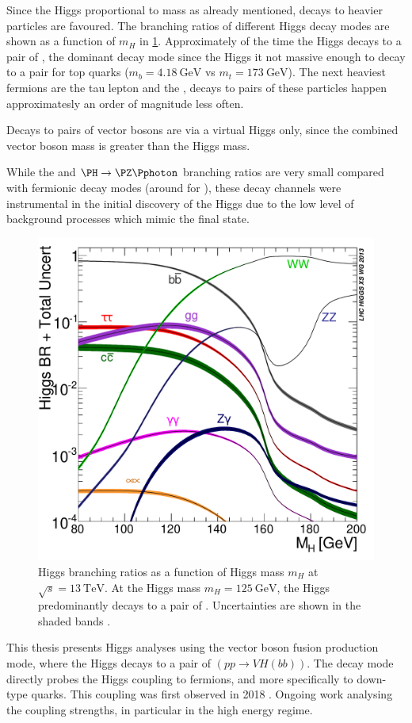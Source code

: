 Since the Higgs proportional to mass as already mentioned, decays to heavier particles are favoured.
The branching ratios of different Higgs decay modes are shown as a function of $m_H$ in \cref{fig:higgs_br}.
Approximately  of the time the Higgs decays to a pair of \bquarks, the dominant decay mode since the Higgs it not massive enough to decay to a pair for top quarks ($m_b = \SI{4.18}{\GeV}$ vs $m_t = \SI{173}{\GeV}$).
The next heaviest fermions are the tau lepton and the \cquark, decays to pairs of these particles happen approximatesly an order of magnitude less often.

Decays to pairs of vector bosons are via a virtual Higgs only, since the combined vector boson mass is greater than the Higgs mass.

While the \Hgammagamma and $\PH \rightarrow \Zboson \Pphoton$ branching ratios are very small compared with fermionic decay modes (around  for \Hgammagamma), these decay channels were instrumental in the initial discovery of the Higgs due to the low level of background processes which mimic the final state.

\begin{figure}[!htbp]
  \centering
  \includegraphics[width=0.5\linewidth]{chapters/1.theory/figs/Higgs_BR_LM.pdf}
  \caption{
    Higgs branching ratios as a function of Higgs mass $m_H$ at $\sqrt{s} = \SI{13}{\TeV}$.
    At the Higgs mass $m_H = \SI{125}{\GeV}$, the Higgs predominantly decays to a pair of \bquarks.
    Uncertainties are shown in the shaded bands \cite{deFlorian:2016spz}.}
  \label{fig:higgs_br}
\end{figure}

This thesis presents Higgs analyses using the vector boson fusion production mode, where the Higgs decays to a pair of \bquarks $(pp \rightarrow VH(bb))$.
The \Hbb decay mode directly probes the Higgs coupling to fermions, and more specifically to down-type quarks.
This coupling was first observed in 2018 \cite{ATLAS-CONF-2018-036,CMS-HIG-18-016}.
Ongoing work analysing the coupling strengths, in particular in the high energy regime.
